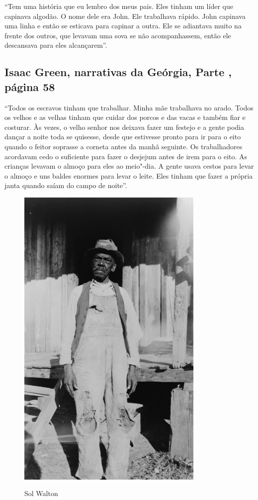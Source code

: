 ``Tem uma história que eu lembro dos meus pais. Eles tinham um líder que
capinava algodão. O nome dele era John. Ele trabalhava rápido. John
capinava uma linha e então se esticava para capinar a outra. Ele se
adiantava muito na frente dos outros, que levavam uma sova se não
acompanhassem, então ele descansava para eles alcançarem''.

\subsection{Isaac Green, narrativas da Geórgia, Parte , página 58}
\label{ref112}

``Todos os escravos tinham que trabalhar. Minha mãe trabalhava no arado.
Todos os velhos e as velhas tinham que cuidar dos porcos e das vacas e
também fiar e costurar. Às vezes, o velho senhor nos deixava fazer um
festejo e a gente podia dançar a noite toda se quisesse, desde que
estivesse pronto para ir para o eito quando o feitor soprasse a corneta
antes da manhã seguinte. Os trabalhadores acordavam cedo o suficiente
para fazer o desjejum antes de irem para o eito. As crianças levavam o
almoço para eles ao meio"-dia. A gente usava cestos para levar o almoço e
uns baldes enormes para levar o leite. Eles tinham que fazer a própria
janta quando saíam do campo de noite''.



\begin{figure}[]
\centering
 \includegraphics[width=90mm]{./imgs/solwaltson_recorte.jpg} \label{img3}
\caption{Sol Walton}
\end{figure}

